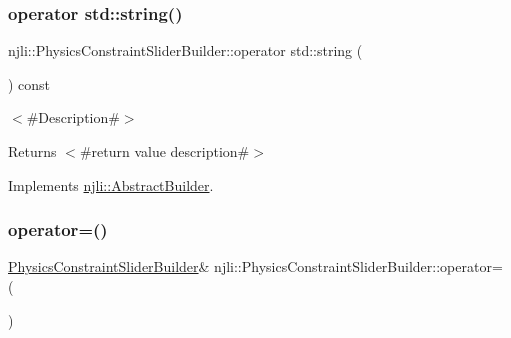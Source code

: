 \subsubsection{\texorpdfstring{operator std\+::string()}{operator std::string()}}
{\footnotesize\ttfamily njli\+::\+Physics\+Constraint\+Slider\+Builder\+::operator std\+::string (\begin{DoxyParamCaption}{ }\end{DoxyParamCaption}) const\hspace{0.3cm}{\ttfamily [virtual]}}

$<$\#\+Description\#$>$

\begin{DoxyReturn}{Returns}
$<$\#return value description\#$>$ 
\end{DoxyReturn}


Implements \mbox{\hyperlink{classnjli_1_1_abstract_builder_a3e6e553e06d1ca30517ad5fb0bd4d000}{njli\+::\+Abstract\+Builder}}.

\mbox{\label{classnjli_1_1_physics_constraint_slider_builder_af241f4529e2d0e4cc6cb9912dc064dcd}} 
\subsubsection{\texorpdfstring{operator=()}{operator=()}}
{\footnotesize\ttfamily \mbox{\hyperlink{classnjli_1_1_physics_constraint_slider_builder}{Physics\+Constraint\+Slider\+Builder}}\& njli\+::\+Physics\+Constraint\+Slider\+Builder\+::operator= (\begin{DoxyParamCaption}\item[{const \mbox{\hyperlink{classnjli_1_1_physics_constraint_slider_builder}{Physics\+Constraint\+Slider\+Builder}} \&}]{ }\end{DoxyParamCaption})\hspace{0.3cm}{\ttfamily [protected]}}

\mbox{\label{classnjli_1_1_physics_constraint_slider_builder_ada9a4323c249d514ddc490dd5376f592}} 
